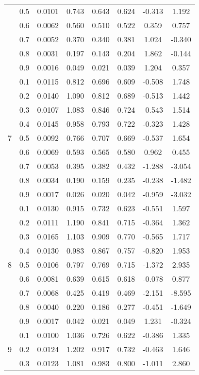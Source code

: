 \documentclass[11pt,a4paper]{report}
\begin{document}
\begin{longtable}{ | c | c || c | c | c | c | c | c | }
 & 0.5 & 0.0101 & 0.743 & 0.643 & 0.624 & -0.313 & 1.192 \\
 & 0.6 & 0.0062 & 0.560 & 0.510 & 0.522 & 0.359 & 0.757 \\
 & 0.7 & 0.0052 & 0.370 & 0.340 & 0.381 & 1.024 & -0.340 \\
 & 0.8 & 0.0031 & 0.197 & 0.143 & 0.204 & 1.862 & -0.144 \\
 & 0.9 & 0.0016 & 0.049 & 0.021 & 0.039 & 1.204 & 0.357 \\
 \hline
\multirow{9}{*}{7} & 0.1 & 0.0115 & 0.812 & 0.696 & 0.609 & -0.508 & 1.748 \\
 & 0.2 & 0.0140 & 1.090 & 0.812 & 0.689 & -0.513 & 1.442 \\
 & 0.3 & 0.0107 & 1.083 & 0.846 & 0.724 & -0.543 & 1.514 \\
 & 0.4 & 0.0145 & 0.958 & 0.793 & 0.722 & -0.323 & 1.428 \\
 & 0.5 & 0.0092 & 0.766 & 0.707 & 0.669 & -0.537 & 1.654 \\
 & 0.6 & 0.0069 & 0.593 & 0.565 & 0.580 & 0.962 & 0.455 \\
 & 0.7 & 0.0053 & 0.395 & 0.382 & 0.432 & -1.288 & -3.054 \\
 & 0.8 & 0.0034 & 0.190 & 0.159 & 0.235 & -0.238 & -1.482 \\
 & 0.9 & 0.0017 & 0.026 & 0.020 & 0.042 & -0.959 & -3.032 \\
 \hline
\multirow{9}{*}{8} & 0.1 & 0.0130 & 0.915 & 0.732 & 0.623 & -0.551 & 1.597 \\
 & 0.2 & 0.0111 & 1.190 & 0.841 & 0.715 & -0.364 & 1.362 \\
 & 0.3 & 0.0165 & 1.103 & 0.909 & 0.770 & -0.565 & 1.717 \\
 & 0.4 & 0.0130 & 0.983 & 0.867 & 0.757 & -0.820 & 1.953 \\
 & 0.5 & 0.0106 & 0.797 & 0.769 & 0.715 & -1.372 & 2.935 \\
 & 0.6 & 0.0081 & 0.639 & 0.615 & 0.618 & -0.078 & 0.877 \\
 & 0.7 & 0.0068 & 0.425 & 0.419 & 0.469 & -2.151 & -8.595 \\
 & 0.8 & 0.0040 & 0.220 & 0.186 & 0.277 & -0.451 & -1.649 \\
 & 0.9 & 0.0017 & 0.042 & 0.021 & 0.049 & 1.231 & -0.324 \\
 \hline
\multirow{9}{*}{9} & 0.1 & 0.0100 & 1.036 & 0.726 & 0.622 & -0.386 & 1.335 \\
 & 0.2 & 0.0124 & 1.202 & 0.917 & 0.732 & -0.463 & 1.646 \\
 & 0.3 & 0.0123 & 1.081 & 0.983 & 0.800 & -1.011 & 2.860 \\

\end{longtable}
\end{document}
